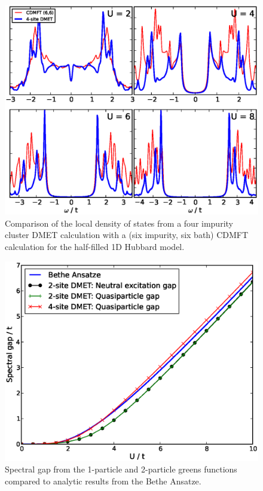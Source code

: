 \documentclass[aps,showpacs,twocolumn,nobibnotes]{revtex4}
\begin{document}
\begin{figure}
\begin{center}
\includegraphics[scale=0.475]{Plots/1D_Spectra/1D_Hub_Spectra.eps}
\end{center}
\caption{Comparison of the local density of states from a four impurity cluster DMET calculation with a
(six impurity, six bath) CDMFT calculation for the half-filled 1D Hubbard model.}
\label{1D_DOS}
\end{figure}

\begin{figure}
\begin{center}
\includegraphics[scale=0.475]{Plots/1D_Gap/Hubbard_Gap.eps}
\end{center}
\caption{Spectral gap from the 1-particle and 2-particle greens functions compared to analytic results
from the Bethe Ansatze\cite{Ovchinni1970}.}
\label{1D_GAP}
\end{figure}
\end{document}

